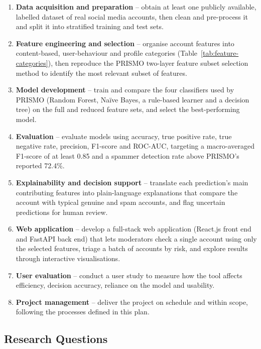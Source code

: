 \begin{enumerate}[label=\textbf{O\arabic*}, leftmargin=2.5em, itemsep=0.3em]
  \item \textbf{Data acquisition and preparation} -- obtain at least one publicly available, labelled dataset of real social media accounts, then clean and pre-process it and split it into stratified training and test sets.
  \item \textbf{Feature engineering and selection} -- organise account features into content-based, user-behaviour and profile categories (Table~\ref{tab:feature-categories}), then reproduce the PRISMO two-layer feature subset selection method \parencite{agrawal2018prismo} to identify the most relevant subset of features.
  \item \textbf{Model development} -- train and compare the four classifiers used by PRISMO (Random Forest, Na\"ive Bayes, a rule-based learner and a decision tree) on the full and reduced feature sets, and select the best-performing model.
  \item \textbf{Evaluation} -- evaluate models using accuracy, true positive rate, true negative rate, precision, F1-score and ROC-AUC, targeting a macro-averaged F1-score of at least 0.85 and a spammer detection rate above PRISMO's reported 72.4\%.
  \item \textbf{Explainability and decision support} -- translate each prediction's main contributing features into plain-language explanations that compare the account with typical genuine and spam accounts, and flag uncertain predictions for human review.
  \item \textbf{Web application} -- develop a full-stack web application (React.js front end and FastAPI back end) that lets moderators check a single account using only the selected features, triage a batch of accounts by risk, and explore results through interactive visualisations.
  \item \textbf{User evaluation} -- conduct a user study to measure how the tool affects efficiency, decision accuracy, reliance on the model and usability.
  \item \textbf{Project management} -- deliver the project on schedule and within scope, following the processes defined in this plan.
\end{enumerate}

\subsection{Research Questions}\label{sec:rqs}

